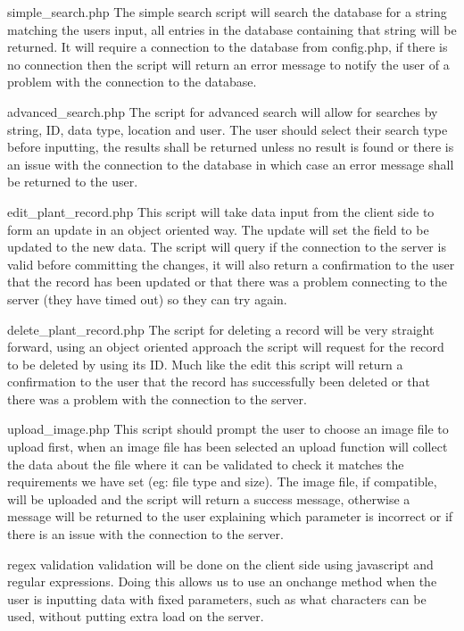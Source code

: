 simple\_search.php
The simple search script will search the database for a string matching the users input, all entries in the database containing that string will be returned. It will require a connection to the database from config.php, if there is no connection then the script will return an error message to notify the user of a problem with the connection to the database.

advanced\_search.php
The script for advanced search will allow for searches by string, ID, data type, location and user. The user should select their search type before inputting, the results shall be returned unless no result is found or there is an issue with the connection to the database in which case an error message shall be returned to the user. 

edit\_plant\_record.php
This script will take data input from the client side to form an update in an object oriented way. The update will set the field to be updated to the new data. The script will query if the connection to the server is valid before committing the changes, it will also return a confirmation to the user that the record has been updated or that there was a problem connecting to the server (they have timed out) so they can try again.

delete\_plant\_record.php
The script for deleting a record will be very straight forward, using an object oriented approach the script will request for the record to be deleted by using its ID. Much like the edit this script will return a confirmation to the user that the record has successfully been deleted or that there was a problem with the connection to the server.

upload\_image.php
This script should prompt the user to choose an image file to upload first, when an image file has been selected an upload function will collect the data about the file where it can be validated to check it matches the requirements we have set (eg: file type and size). The image file, if compatible, will be uploaded and the script will return a success message, otherwise a message will be returned to the user explaining which parameter is incorrect or if there is an issue with the connection to the server.

regex validation
validation will be done on the client side using javascript and regular expressions. Doing this allows us to use an onchange method when the user is inputting data with fixed parameters, such as what characters can be used, without putting extra load on the server.
